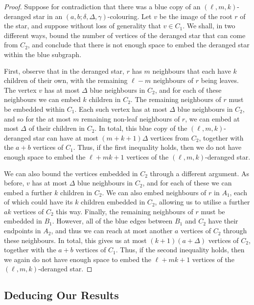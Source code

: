 \documentclass[11pt]{article}
\begin{document}
\begin{proof}
    Suppose for contradiction that there was a blue copy of an $(\ell, m, k)$-deranged star in an $(a,b;\delta, \Delta, \gamma)$-colouring. Let $v$ be the image of the root $r$ of the star, and suppose without loss of generality that $v \in C_1$. We shall, in two different ways, bound the number of vertices of the deranged star that can come from $C_2$, and conclude that there is not enough space to embed the deranged star within the blue subgraph.

    First, observe that in the deranged star, $r$ has $m$ neighbours that each have $k$ children of their own, with the remaining $\ell - m$ neighbours of $r$ being leaves. The vertex $v$ has at most $\Delta$ blue neighbours in $C_2$, and for each of these neighbours we can embed $k$ children in $C_2$. The remaining neighbours of $r$ must be embedded within $C_1$. Each such vertex has at most $\Delta$ blue neighbours in $C_2$, and so for the at most $m$ remaining non-leaf neighbours of $r$, we can embed at most $\Delta$ of their children in $C_2$. In total, this blue copy of the $(\ell, m, k)$-deranged star can have at most $(m + k + 1)\Delta$ vertices from $C_2$, together with the $a + b$ vertices of $C_1$. Thus, if the first inequality holds, then we do not have enough space to embed the $\ell + mk + 1$ vertices of the $(\ell, m, k)$-deranged star.

    We can also bound the vertices embedded in $C_2$ through a different argument. As before, $v$ has at most $\Delta$ blue neighbours in $C_2$, and for each of these we can embed a further $k$ children in $C_2$. We can also embed neighbours of $r$ in $A_1$, each of which could have its $k$ children embedded in $C_2$, allowing us to utilise a further $a k$ vertices of $C_2$ this way. Finally, the remaining neighbours of $r$ must be embedded in $B_1$. However, all of the blue edges between $B_1$ and $C_2$ have their endpoints in $A_2$, and thus we can reach at most another $a$ vertices of $C_2$ through these neighbours. In total, this gives us at most $(k+1)(a + \Delta)$ vertices of $C_2$, together with the $a + b$ vertices of $C_1$. Thus, if the second inequality holds, then we again do not have enough space to embed the $\ell + mk + 1$ vertices of the $(\ell, m, k)$-deranged star.
\end{proof}

\subsection{Deducing Our Results}
\end{document}
